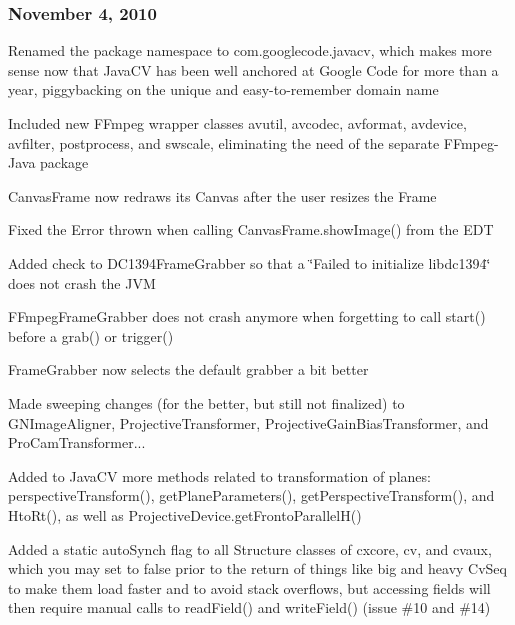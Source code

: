 \subsubsection*{November 4, 2010}


\begin{DoxyItemize}
\item Renamed the package namespace to {\ttfamily com.\+googlecode.\+javacv}, which makes more sense now that Java\+C\+V has been well anchored at Google Code for more than a year, piggybacking on the unique and easy-\/to-\/remember domain name
\item Included new F\+Fmpeg wrapper classes {\ttfamily avutil}, {\ttfamily avcodec}, {\ttfamily avformat}, {\ttfamily avdevice}, {\ttfamily avfilter}, {\ttfamily postprocess}, and {\ttfamily swscale}, eliminating the need of the separate F\+Fmpeg-\/\+Java package
\item {\ttfamily Canvas\+Frame} now redraws its {\ttfamily Canvas} after the user resizes the {\ttfamily Frame}
\item Fixed the {\ttfamily Error} thrown when calling {\ttfamily Canvas\+Frame.\+show\+Image()} from the E\+D\+T
\item Added check to {\ttfamily D\+C1394\+Frame\+Grabber} so that a \char`\"{}\+Failed to initialize libdc1394\char`\"{} does not crash the J\+V\+M
\item {\ttfamily F\+Fmpeg\+Frame\+Grabber} does not crash anymore when forgetting to call {\ttfamily start()} before a {\ttfamily grab()} or {\ttfamily trigger()}
\item {\ttfamily Frame\+Grabber} now selects the default grabber a bit better
\item Made sweeping changes (for the better, but still not finalized) to {\ttfamily G\+N\+Image\+Aligner}, {\ttfamily Projective\+Transformer}, {\ttfamily Projective\+Gain\+Bias\+Transformer}, and {\ttfamily Pro\+Cam\+Transformer}...
\item Added to {\ttfamily Java\+C\+V} more methods related to transformation of planes\+: {\ttfamily perspective\+Transform()}, {\ttfamily get\+Plane\+Parameters()}, {\ttfamily get\+Perspective\+Transform()}, and {\ttfamily Hto\+Rt()}, as well as {\ttfamily Projective\+Device.\+get\+Fronto\+Parallel\+H()}
\item Added a static {\ttfamily auto\+Synch} flag to all {\ttfamily Structure} classes of {\ttfamily cxcore}, {\ttfamily cv}, and {\ttfamily cvaux}, which you may set to {\ttfamily false} prior to the return of things like big and heavy {\ttfamily Cv\+Seq} to make them load faster and to avoid stack overflows, but accessing fields will then require manual calls to {\ttfamily read\+Field()} and {\ttfamily write\+Field()} (issue \#10 and \#14)

\end{DoxyItemize}
